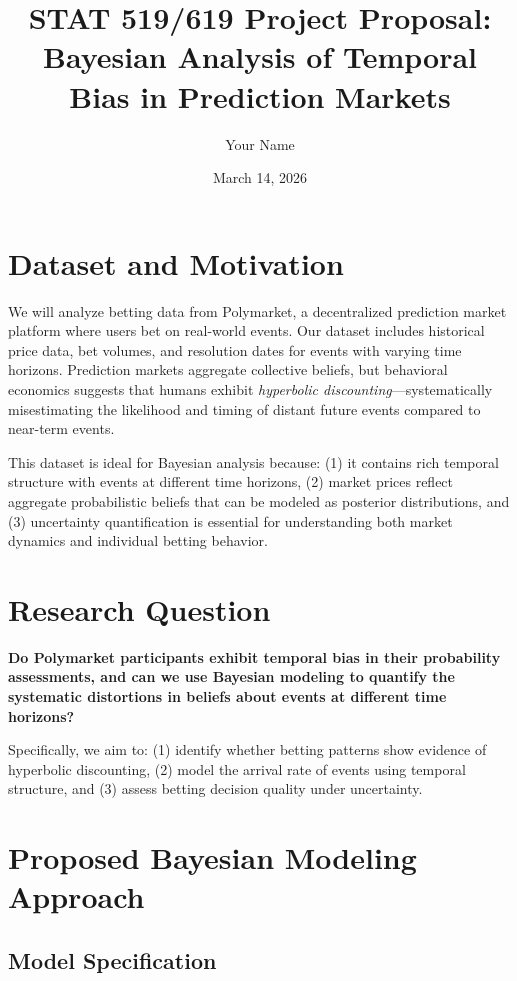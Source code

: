 \documentclass[11pt]{article}
\title{STAT 519/619 Project Proposal: Bayesian Analysis of Temporal Bias in Prediction Markets}
\author{Your Name}
\date{March 14, 2026}
\begin{document}
\maketitle

\section{Dataset and Motivation}

We will analyze betting data from Polymarket, a decentralized prediction market platform where users bet on real-world events. Our dataset includes historical price data, bet volumes, and resolution dates for events with varying time horizons. Prediction markets aggregate collective beliefs, but behavioral economics suggests that humans exhibit \textit{hyperbolic discounting}---systematically misestimating the likelihood and timing of distant future events compared to near-term events.

This dataset is ideal for Bayesian analysis because: (1) it contains rich temporal structure with events at different time horizons, (2) market prices reflect aggregate probabilistic beliefs that can be modeled as posterior distributions, and (3) uncertainty quantification is essential for understanding both market dynamics and individual betting behavior.

\section{Research Question}

\textbf{Do Polymarket participants exhibit temporal bias in their probability assessments, and can we use Bayesian modeling to quantify the systematic distortions in beliefs about events at different time horizons?}

Specifically, we aim to: (1) identify whether betting patterns show evidence of hyperbolic discounting, (2) model the arrival rate of events using temporal structure, and (3) assess betting decision quality under uncertainty.

\section{Proposed Bayesian Modeling Approach}

\subsection{Model Specification}
\end{document}
